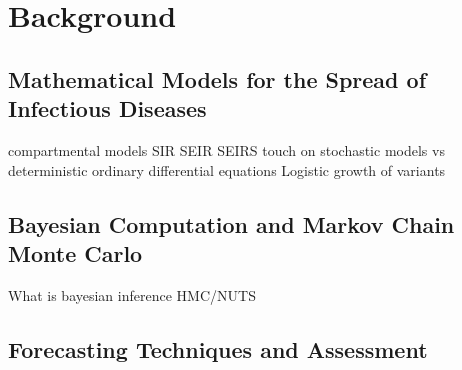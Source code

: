 \chapter{Background}
\label{ch:background}

\section{Mathematical Models for the Spread of Infectious Diseases}
\label{sec:math_models}
compartmental models
SIR
SEIR
SEIRS
touch on stochastic models vs deterministic
ordinary differential equations
Logistic growth of variants

\section{Bayesian Computation and Markov Chain Monte Carlo}
\label{sec:bayesian-mcmc}
What is bayesian inference
HMC/NUTS

\section{Forecasting Techniques and Assessment}
\label{sec:forecasting_techniques_and_assessment}
